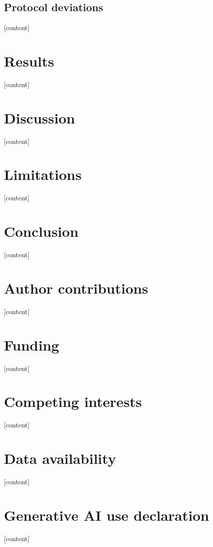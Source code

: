 \documentclass[12pt]{article}
\begin{document}
\subsection{Protocol deviations}
[content]

\section{Results}
[content]

\section{Discussion}
[content]

\section{Limitations}
[content]

\section{Conclusion}
[content]

\section*{Author contributions}
[content]

\section*{Funding}
[content]

\section*{Competing interests}
[content]

\section*{Data availability}
[content]

\section*{Generative AI use declaration}
[content]



\end{document}
